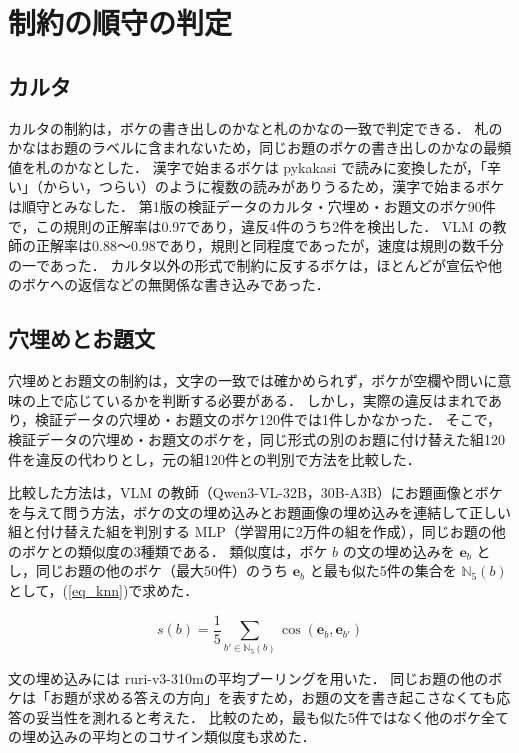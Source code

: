 \section{制約の順守の判定}
\label{sec_compliance}
\subsection{カルタ}
カルタの制約は，ボケの書き出しのかなと札のかなの一致で判定できる．
札のかなはお題のラベルに含まれないため，同じお題のボケの書き出しのかなの最頻値を札のかなとした．
漢字で始まるボケは pykakasi で読みに変換したが，「辛い」（からい，つらい）のように複数の読みがありうるため，漢字で始まるボケは順守とみなした．
第1版の検証データのカルタ・穴埋め・お題文のボケ90件で，この規則の正解率は0.97であり，違反4件のうち2件を検出した．
VLM の教師の正解率は0.88〜0.98であり，規則と同程度であったが，速度は規則の数千分の一であった．
カルタ以外の形式で制約に反するボケは，ほとんどが宣伝や他のボケへの返信などの無関係な書き込みであった．

\subsection{穴埋めとお題文}
穴埋めとお題文の制約は，文字の一致では確かめられず，ボケが空欄や問いに意味の上で応じているかを判断する必要がある．
しかし，実際の違反はまれであり，検証データの穴埋め・お題文のボケ120件では1件しかなかった．
そこで，検証データの穴埋め・お題文のボケを，同じ形式の別のお題に付け替えた組120件を違反の代わりとし，元の組120件との判別で方法を比較した．

比較した方法は，VLM の教師（Qwen3-VL-32B，30B-A3B）にお題画像とボケを与えて問う方法，ボケの文の埋め込みとお題画像の埋め込みを連結して正しい組と付け替えた組を判別する MLP（学習用に2万件の組を作成），同じお題の他のボケとの類似度の3種類である．
類似度は，ボケ $ b $ の文の埋め込みを $ {\mathbf e}_b $ とし，同じお題の他のボケ（最大50件）のうち $ {\mathbf e}_b $ と最も似た5件の集合を $ {\mathbb N}_5(b) $ として，(\ref{eq_knn})で求めた．

\begin{equation}
    s(b) = \frac{1}{5} \sum_{b' \in {\mathbb N}_5(b)} \cos ( {\mathbf e}_b, {\mathbf e}_{b'} )
    \label{eq_knn}
\end{equation}

\noindent
文の埋め込みには ruri-v3-310m\cite{ref_ruri}の平均プーリングを用いた．
同じお題の他のボケは「お題が求める答えの方向」を表すため，お題の文を書き起こさなくても応答の妥当性を測れると考えた．
比較のため，最も似た5件ではなく他のボケ全ての埋め込みの平均とのコサイン類似度も求めた．

